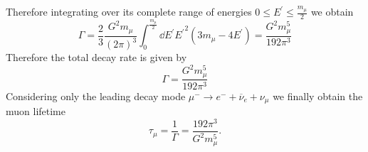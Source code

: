 Therefore integrating over its complete range of energies $0 \leq E^' \leq \frac{m_{\mu}}{2}$ we obtain
\begin{equation} \label{q}
\Gamma = \frac{2}{3} \frac{ G^2 m_{\mu} }{ (2 \pi)^3}  \int_{0}^{\frac{m_{\mu}}{2}} \dd E^'  {E^'}^2\left(3 m_{\mu} - 4 E^' \right) = \frac{G^2 m_{\mu}^5}{192 \pi^3}
\end{equation}
Therefore the total decay rate is given by
\begin{equation} \label{16.68}
\Gamma = \frac{G^2 m_{\mu}^5}{192 \pi^3}
\end{equation}
Considering only the leading decay mode $\mu^- \rightarrow e^- + \overline \nu_{e} + \nu_{\mu}$ we finally obtain the muon lifetime
\begin{equation} \label{16.69}
\tau_{\mu} = \frac{1}{\Gamma} = \frac{192 \pi^3}{G^2 m_{\mu}^5}.
\end{equation}